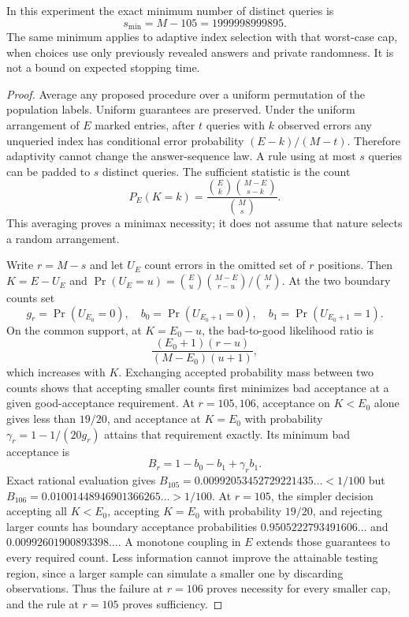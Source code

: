 \begin{proposition}
In this experiment the exact minimum number of distinct queries is
\[
 s_{\min}=M-105=1999998999895.
\]
The same minimum applies to adaptive index selection with that worst-case cap, when choices use only previously revealed answers and private randomness. It is not a bound on expected stopping time.
\end{proposition}
\begin{proof}
Average any proposed procedure over a uniform permutation of the population labels. Uniform guarantees are preserved. Under the uniform arrangement of $E$ marked entries, after $t$ queries with $k$ observed errors any unqueried index has conditional error probability $(E-k)/(M-t)$. Therefore adaptivity cannot change the answer-sequence law. A rule using at most $s$ queries can be padded to $s$ distinct queries. The sufficient statistic is the count
\[
 P_E(K=k)=\frac{\binom Ek\binom{M-E}{s-k}}{\binom Ms}.
\]
This averaging proves a minimax necessity; it does not assume that nature selects a random arrangement.

Write $r=M-s$ and let $U_E$ count errors in the omitted set of $r$ positions. Then $K=E-U_E$ and
$\Pr(U_E=u)=\binom Eu\binom{M-E}{r-u}/\binom Mr$.
At the two boundary counts set
\[
 g_r=\Pr(U_{E_0}=0),\quad b_0=\Pr(U_{E_0+1}=0),\quad b_1=\Pr(U_{E_0+1}=1).
\]
On the common support, at $K=E_0-u$, the bad-to-good likelihood ratio is
\[
 \frac{(E_0+1)(r-u)}{(M-E_0)(u+1)},
\]
which increases with $K$. Exchanging accepted probability mass between two counts shows that accepting smaller counts first minimizes bad acceptance at a given good-acceptance requirement. At $r=105,106$, acceptance on $K<E_0$ alone gives less than $19/20$, and acceptance at $K=E_0$ with probability
$\gamma_r=1-1/(20g_r)$ attains that requirement exactly. Its minimum bad acceptance is
\[
 B_r=1-b_0-b_1+\gamma_rb_1.
\]
Exact rational evaluation gives $B_{105}=0.00992053452729221435\ldots<1/100$ but
$B_{106}=0.01001448946901366265\ldots>1/100$.
At $r=105$, the simpler decision accepting all $K<E_0$, accepting $K=E_0$ with probability $19/20$, and rejecting larger counts has boundary acceptance probabilities
$0.9505222793491606\ldots$ and $0.00992601900893398\ldots$.
A monotone coupling in $E$ extends those guarantees to every required count. Less information cannot improve the attainable testing region, since a larger sample can simulate a smaller one by discarding observations. Thus the failure at $r=106$ proves necessity for every smaller cap, and the rule at $r=105$ proves sufficiency.
\end{proof}

